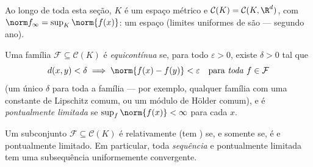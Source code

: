 Ao longo de toda esta seção, $K$ é um espaço métrico
\emph{} e $\mathcal
C(K) = \mathcal C(K, \R^d)$, com $\norm f_\infty = \sup_K
\norm{f(x)}$: um espaço  (limites
uniformes de  são  --- segundo ano).

\begin{definition}\label{def:b3:complete:equicontinuous}
Uma família $\mathcal F \subseteq \mathcal C(K)$ é \emph{equicontínua} se,
para todo $\varepsilon > 0$, existe $\delta > 0$ tal que
\[
d(x, y) < \delta \implies \norm{f(x) - f(y)} < \varepsilon
\quad\text{para \emph{toda} } f \in \mathcal F
\]
(um único $\delta$ para toda a família --- por exemplo, qualquer
família com uma constante de Lipschitz comum, ou um módulo de Hölder
comum), e é \emph{pontualmente limitada} se $\sup_{f}\norm{f(x)} < \infty$ para cada $x$.
\end{definition}

\begin{theorem}\label{thm:b3:complete:ascoli}
Um subconjunto $\mathcal F \subseteq \mathcal C(K)$ é relativamente  (tem  ) se,
e somente se, é  e pontualmente limitado. Em particular,
toda \emph{sequência}  e pontualmente limitada tem uma
subsequência uniformemente convergente.
\end{theorem}

